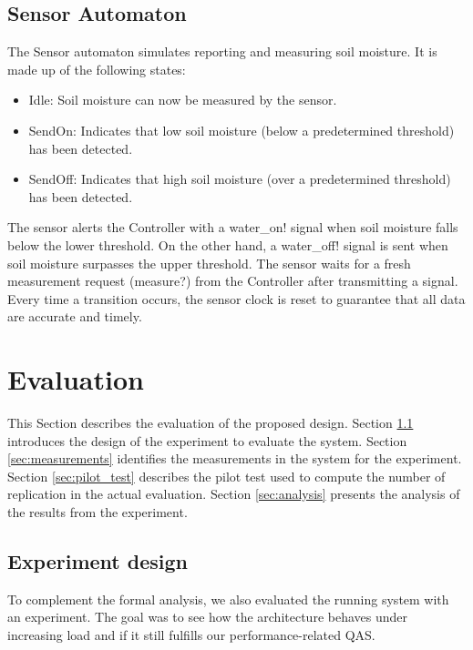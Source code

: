 \documentclass[conference]{IEEEtran}
\begin{document}
\subsection{Sensor Automaton}

The Sensor automaton simulates reporting and measuring soil moisture. It is made up of the following states:

\begin{itemize}
    \item Idle: Soil moisture can now be measured by the sensor.
    \item SendOn: Indicates that low soil moisture (below a predetermined threshold) has been detected.
    \item SendOff: Indicates that high soil moisture (over a predetermined threshold) has been detected.
\end{itemize}

The sensor alerts the Controller with a water\_on! signal when soil moisture falls below the lower threshold. On the other hand, a water\_off! signal is sent when soil moisture surpasses the upper threshold. The sensor waits for a fresh measurement request (measure?) from the Controller after transmitting a signal. Every time a transition occurs, the sensor clock is reset to guarantee that all data are accurate and timely.

\section{Evaluation}
\label{sec:evaluation}

This Section describes the evaluation of the proposed design.
Section \ref{sec:design} introduces the design of the experiment to evaluate the system. 
Section \ref{sec:measurements} identifies the measurements in the system for the experiment.
Section \ref{sec:pilot_test} describes the pilot test used to compute the number of replication in the actual evaluation. 
Section \ref{sec:analysis} presents the analysis of the results from the experiment. 

\subsection{Experiment design}
\label{sec:design}

To complement the formal analysis, we also evaluated the running system with an experiment. The goal was to see how the architecture behaves under increasing load and if it still fulfills our performance-related QAS.
\end{document}
